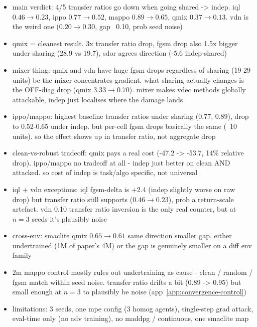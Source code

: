 \documentclass{article}
\begin{document}
\begin{itemize}
  \item main verdict: 4/5 transfer ratios go down when going shared -> indep. iql $0.46 \to 0.23$, ippo $0.77 \to 0.52$, mappo $0.89 \to 0.65$, qmix $0.37 \to 0.13$. vdn is the weird one ($0.20 \to 0.30$, gap ~0.10, prob seed noise)
  \item qmix = cleanest result. 3x transfer ratio drop, fgsm drop also 1.5x bigger under sharing (28.9 vs 19.7), sdor agrees direction (-5.6 indep-shared)
  \item mixer thing: qmix and vdn have huge fgsm drops regardless of sharing (19-29 units) bc the mixer concentrates gradient. what sharing actually changes is the OFF-diag drop (qmix $3.33 \to 0.70$). mixer makes vdec methods globally attackable, indep just localises where the damage lands
  \item ippo/mappo: highest baseline transfer ratios under sharing (0.77, 0.89), drop to 0.52-0.65 under indep. but per-cell fgsm drops basically the same (~10 units). so the effect shows up in transfer ratio, not aggregate drop
  \item clean-vs-robust tradeoff: qmix pays a real cost (-47.2 -> -53.7, 14\% relative drop). ippo/mappo no tradeoff at all - indep just better on clean AND attacked. so cost of indep is task/algo specific, not universal
  \item iql + vdn exceptions: iql fgsm-delta is +2.4 (indep slightly worse on raw drop) but transfer ratio still supports ($0.46 \to 0.23$), prob a return-scale artefact. vdn 0.10 transfer ratio inversion is the only real counter, but at $n=3$ seeds it's plausibly noise
  \item cross-env: smaclite qmix $0.65 \to 0.61$ same direction smaller gap. either undertrained (1M of paper's 4M) or the gap is genuinely smaller on a diff env family
  \item 2m mappo control mostly rules out undertraining as cause - clean / random / fgsm match within seed noise. transfer ratio drifts a bit (0.89 -> 0.95) but small enough at $n=3$ to plausibly be noise (app~\ref{app:convergence-control})
  \item limitations: 3 seeds, one mpe config (3 homog agents), single-step grad attack, eval-time only (no adv training), no maddpg / continuous, one smaclite map
\end{itemize}


\end{document}
